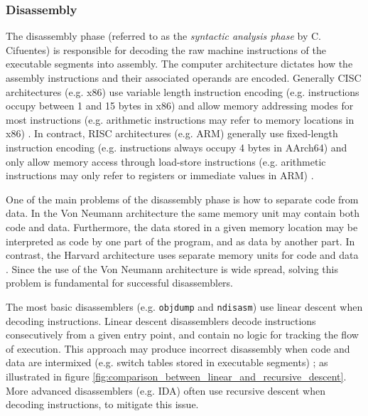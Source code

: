 
\subsubsection{Disassembly}
\label{sec:lit_review_disassembly}

The disassembly phase (referred to as the \textit{syntactic analysis phase} by C. Cifuentes) is responsible for decoding the raw machine instructions of the executable segments into assembly. The computer architecture dictates how the assembly instructions and their associated operands are encoded. Generally CISC architectures (e.g. x86) use variable length instruction encoding (e.g. instructions occupy between 1 and 15 bytes in x86) and allow memory addressing modes for most instructions (e.g. arithmetic instructions may refer to memory locations in x86) \cite{x86_manual}. In contract, RISC architectures (e.g. ARM) generally use fixed-length instruction encoding (e.g. instructions always occupy 4 bytes in AArch64) and only allow memory access through load-store instructions (e.g. arithmetic instructions may only refer to registers or immediate values in ARM) \cite{arm_manual}.

One of the main problems of the disassembly phase is how to separate code from data. In the Von Neumann architecture the same memory unit may contain both code and data. Furthermore, the data stored in a given memory location may be interpreted as code by one part of the program, and as data by another part. In contrast, the Harvard architecture uses separate memory units for code and data \cite{von_neumann_vs_harvard}. Since the use of the Von Neumann architecture is wide spread, solving this problem is fundamental for successful disassemblers.

The most basic disassemblers (e.g. \texttt{objdump} and \texttt{ndisasm}) use linear descent when decoding instructions. Linear descent disassemblers decode instructions consecutively from a given entry point, and contain no logic for tracking the flow of execution. This approach may produce incorrect disassembly when code and data are intermixed (e.g. switch tables stored in executable segments) \cite{reverse_comp}; as illustrated in figure \ref{fig:comparison_between_linear_and_recursive_descent}. More advanced disassemblers (e.g. IDA) often use recursive descent when decoding instructions, to mitigate this issue.

